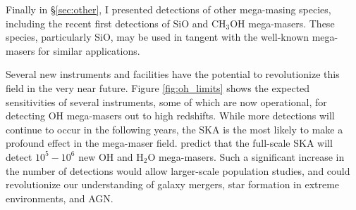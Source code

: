 Finally in \S\ref{sec:other}, I presented detections of other mega-masing species, including the recent first detections of SiO and CH$_3$OH mega-masers. These species, particularly SiO, may be used in tangent with the well-known mega-masers for similar applications.

Several new instruments and facilities have the potential to revolutionize this field in the very near future. Figure \ref{fig:oh_limits} shows the expected sensitivities of several instruments, some of which are now operational, for detecting OH mega-masers out to high redshifts. While more detections will continue to occur in the following years, the SKA is the most likely to make a profound effect in the mega-maser field. \citet{Morganti_2004} predict that the full-scale SKA will detect $10^5 - 10^6$ new OH and H$_2$O mega-masers. Such a significant increase in the number of detections would allow larger-scale population studies, and could revolutionize our understanding of galaxy mergers, star formation in extreme environments, and AGN.